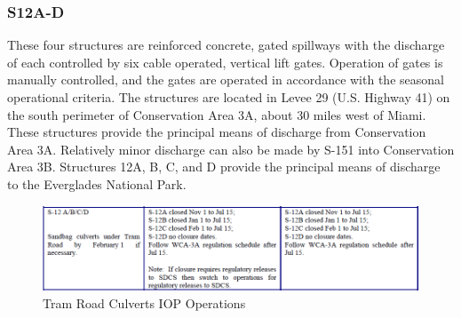 \clearpage
\subsubsection{S12A-D}

These four structures are reinforced concrete, gated spillways with the discharge of each controlled by six cable operated, vertical lift gates. Operation of gates is manually controlled, and the gates are operated in accordance with the seasonal operational criteria. The structures are located in Levee 29 (U.S. Highway 41) on the south perimeter of Conservation Area 3A, about 30 miles west of Miami. These structures provide the principal means of discharge from Conservation Area 3A. Relatively minor discharge can also be made by S-151 into Conservation Area 3B. Structures 12A, B, C, and D provide the principal means of discharge to the Everglades National Park.

%
%

\begin{figure}[!h]
  \begin{center}
  \includegraphics[width=6.5in]{../figs/S12s_IOPops.png}
  \caption{Tram Road Culverts IOP Operations}
  \label{fig:S12siop}
  \end{center}
\end{figure}

